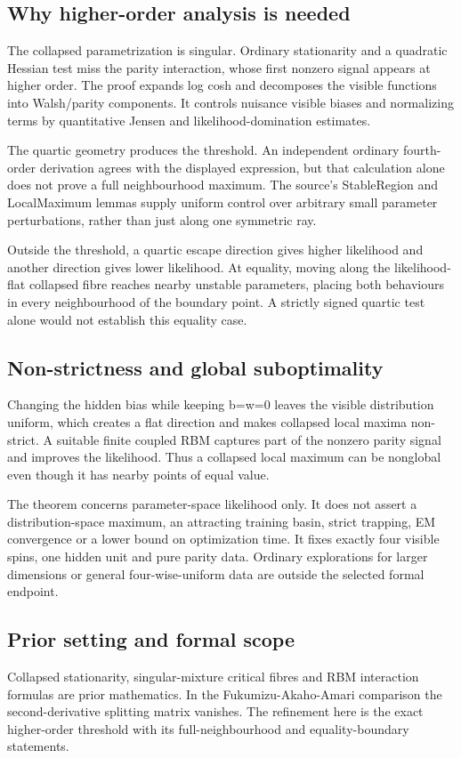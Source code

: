 \documentclass[11pt,a4paper]{article}
\begin{document}
\subsection{Why higher-order analysis is needed}
The collapsed parametrization is singular. Ordinary stationarity and a quadratic Hessian test miss the parity interaction, whose first nonzero signal appears at higher order. The proof expands log cosh and decomposes the visible functions into Walsh/parity components. It controls nuisance visible biases and normalizing terms by quantitative Jensen and likelihood-domination estimates.

The quartic geometry produces the threshold. An independent ordinary fourth-order derivation agrees with the displayed expression, but that calculation alone does not prove a full neighbourhood maximum. The source's StableRegion and LocalMaximum lemmas supply uniform control over arbitrary small parameter perturbations, rather than just along one symmetric ray.

Outside the threshold, a quartic escape direction gives higher likelihood and another direction gives lower likelihood. At equality, moving along the likelihood-flat collapsed fibre reaches nearby unstable parameters, placing both behaviours in every neighbourhood of the boundary point. A strictly signed quartic test alone would not establish this equality case.

\subsection{Non-strictness and global suboptimality}
Changing the hidden bias while keeping b=w=0 leaves the visible distribution uniform, which creates a flat direction and makes collapsed local maxima non-strict. A suitable finite coupled RBM captures part of the nonzero parity signal and improves the likelihood. Thus a collapsed local maximum can be nonglobal even though it has nearby points of equal value.

The theorem concerns parameter-space likelihood only. It does not assert a distribution-space maximum, an attracting training basin, strict trapping, EM convergence or a lower bound on optimization time. It fixes exactly four visible spins, one hidden unit and pure parity data. Ordinary explorations for larger dimensions or general four-wise-uniform data are outside the selected formal endpoint.

\subsection{Prior setting and formal scope}
Collapsed stationarity, singular-mixture critical fibres and RBM interaction formulas are prior mathematics. In the Fukumizu-Akaho-Amari comparison the second-derivative splitting matrix vanishes. The refinement here is the exact higher-order threshold with its full-neighbourhood and equality-boundary statements.
\end{document}
